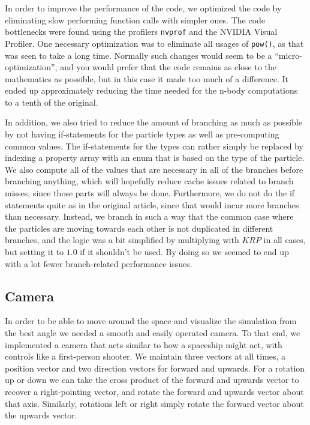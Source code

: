 \documentclass[a4paper]{article}
\begin{document}
In order to improve the performance of the code, we optimized the code by eliminating slow performing function calls with simpler ones.
The code bottlenecks were found using the profilers \verb|nvprof| and the NVIDIA Visual Profiler.
One necessary optimization was to eliminate all usages of \verb|pow()|, as that was seen to take a long time.
Normally such changes would seem to be a ``micro-optimization'', and you would prefer that the code remains as close to the mathematics as possible, but in this case it made too much of a difference.
It ended up approximately reducing the time needed for the n-body computations to a tenth of the original.

In addition, we also tried to reduce the amount of branching as much as possible by not having if-statements for the particle types as well as pre-computing common values.
The if-statements for the types can rather simply be replaced by indexing a property array with an enum that is based on the type of the particle.
We also compute all of the values that are necessary in all of the branches before branching anything, which will hopefully reduce cache issues related to branch misses, since those parts will always be done.
Furthermore, we do not do the if statements quite as in the original article, since that would incur more branches than necessary.
Instead, we branch in such a way that the common case where the particles are moving towards each other is not duplicated in different branches, and the logic was a bit simplified by multiplying with $KRP$ in all cases, but setting it to $1.0$ if it shouldn't be used.
By doing so we seemed to end up with a lot fewer branch-related performance issues.


\subsection{Camera}

In order to be able to move around the space and visualize the simulation from the best angle we needed a smooth and easily operated camera.
To that end, we implemented a camera that acts similar to how a spaceship might act, with controls like a first-person shooter.
We maintain three vectors at all times, a position vector and two direction vectors for forward and upwards.
For a rotation up or down we can take the cross product of the forward and upwards vector to recover a right-pointing vector, and rotate the forward and upwards vector about that axis.
Similarly, rotations left or right simply rotate the forward vector about the upwards vector.
\end{document}
